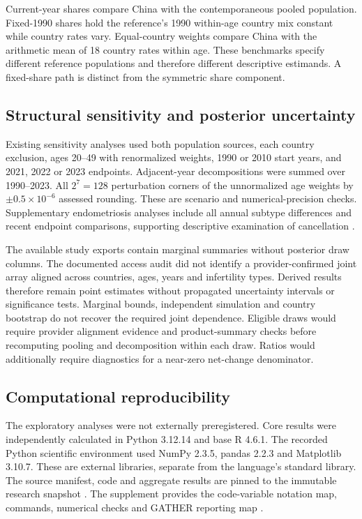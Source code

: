\documentclass[11pt,a4paper]{article}
\begin{document}
Current-year shares compare China with the contemporaneous pooled population. Fixed-1990 shares hold the reference's 1990 within-age country mix constant while country rates vary. Equal-country weights compare China with the arithmetic mean of 18 country rates within age. These benchmarks specify different reference populations and therefore different descriptive estimands. A fixed-share path is distinct from the symmetric share component.

\subsection{Structural sensitivity and posterior uncertainty}
Existing sensitivity analyses used both population sources, each country exclusion, ages 20--49 with renormalized weights, 1990 or 2010 start years, and 2021, 2022 or 2023 endpoints. Adjacent-year decompositions were summed over 1990--2023. All $2^7=128$ perturbation corners of the unnormalized age weights by $\pm0.5\times10^{-6}$ assessed rounding. These are scenario and numerical-precision checks. Supplementary endometriosis analyses include all annual subtype differences and recent endpoint comparisons, supporting descriptive examination of cancellation \citep{xu}.

The available study exports contain marginal summaries without posterior draw columns. The documented access audit did not identify a provider-confirmed joint array aligned across countries, ages, years and infertility types. Derived results therefore remain point estimates without propagated uncertainty intervals or significance tests. Marginal bounds, independent simulation and country bootstrap do not recover the required joint dependence. Eligible draws would require provider alignment evidence and product-summary checks before recomputing pooling and decomposition within each draw. Ratios would additionally require diagnostics for a near-zero net-change denominator.

\subsection{Computational reproducibility}
The exploratory analyses were not externally preregistered. Core results were independently calculated in Python 3.12.14 and base R 4.6.1. The recorded Python scientific environment used NumPy 2.3.5, pandas 2.2.3 and Matplotlib 3.10.7. These are external libraries, separate from the language's standard library. The source manifest, code and aggregate results are pinned to the immutable research snapshot \citep{repository}. The supplement provides the code-variable notation map, commands, numerical checks and GATHER reporting map \citep{gather}.
\end{document}
